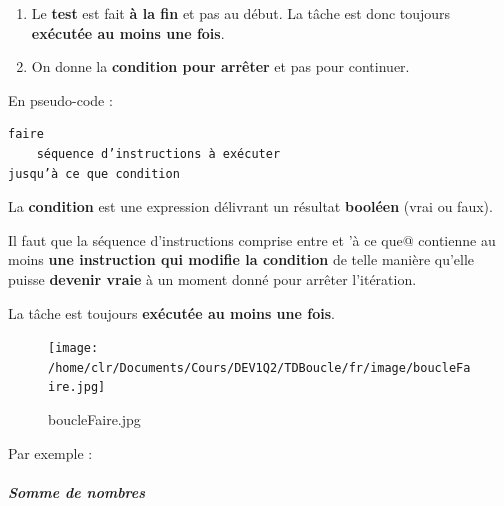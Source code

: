 \documentclass[11pt,a4paper]{article}
\begin{document}
					\begin{enumerate}
				
			\item 
            Le \textbf{test} est fait \textbf{\`a la fin} et pas au d\'ebut. 
            La t\^ache est donc toujours \textbf{ex\'ecut\'ee au moins une fois}.
          
			\item On donne la \textbf{condition pour arr\^eter} et pas pour continuer.
					\end{enumerate}
				
            \par
        En pseudo-code :
            \par
        \begin{verbatim}
faire
    séquence d’instructions à exécuter
jusqu’à ce que condition
      \end{verbatim}
        La \textbf{condition} est une expression d\'elivrant un r\'esultat 
        \textbf{bool\'een} (vrai ou faux).
      
            \par
        
        Il faut que la s\'equence d'instructions comprise entre \verb@faire@ 
        et \verb@jusqu’à ce que@ contienne au moins 
        \textbf{une instruction qui modifie la condition} de telle mani\`ere 
        qu'elle puisse \textbf{devenir vraie} \`a un moment donn\'e pour arr\^eter l'it\'eration.
      
            \par
        
        La t\^ache est toujours \textbf{ex\'ecut\'ee au moins une fois}.
      
            \par
        \begin{figure}[hbt]
				    \begin{center}
					\texttt{[image: /home/clr/Documents/Cours/DEV1Q2/TDBoucle/fr/image/boucleFaire.jpg]}
						\end{center}
                
                    \caption[boucleFaire.jpg]{boucleFaire.jpg}
                \end{figure}
                    
            \par
        Par exemple : 
            \par
        
			
		\subparagraph{Somme de nombres} 
		
\end{document}
